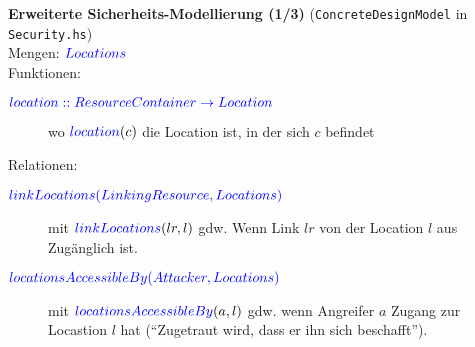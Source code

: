 \documentclass[varwidth=13cm]{standalone}
\begin{document}
\textbf{Erweiterte Sicherheits-Modellierung (1/3)} (\texttt{ConcreteDesignModel} in \texttt{Security.hs})\\

Mengen: ${\color{blue}{Locations}}$  \\


Funktionen:
\begin{description}
  \item[${\color{blue}{location :: ResourceContainer \rightarrow Location}}$]
        wo ${\color{blue}{location}}(c)$ die Location ist, in der sich $c$ befindet
\end{description}


Relationen:
\begin{description}
  \item[${\color{blue}{linkLocations(LinkingResource, Locations)}}$]
        mit ${\color{blue}{linkLocations}}(lr, l)$ gdw. Wenn Link $lr$
        von der Location $l$ aus Zugänglich ist.

  \item[${\color{blue}{locationsAccessibleBy(Attacker, Locations)}}$]
        mit ${\color{blue}{locationsAccessibleBy}}(a, l)$ gdw. wenn Angreifer $a$
        Zugang zur Locastion $l$ hat (\enquote{Zugetraut wird, dass er ihn sich beschafft}).
\end{description}
\end{document}
